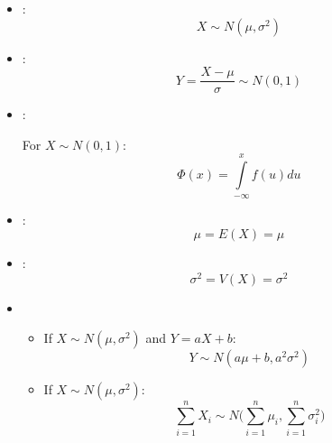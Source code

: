 \begin{multicols*}{3}
    \begin{itemize}
      \item {}:
        \[
          X \sim N(\mu, \sigma^2)
        \]
      \item {}:
        \[
          Y = \frac{X - \mu}{\sigma} \sim N(0, 1)
        \]
      \item {}:
        \par For $X \sim N(0, 1)$:
        \[
          \Phi(x) = \int\limits_{-\infty}^{x} f(u) du
        \]
      \item {}:
        \[
          \mu = E(X) = \mu
        \]
      \item {}:
        \[
          \sigma^2 = V(X) = \sigma^2
        \]
      \item {}
        \begin{itemize}
          \item If $X \sim N(\mu, \sigma^2)$ and $Y = aX + b$:
            \[
              Y \sim N(a\mu + b, a^2 \sigma^2)
            \]
          \item If $X \sim N(\mu, \sigma^2)$:
            \[
              \sum\limits_{i = 1}^{n} X_i \sim N\bigg( \sum\limits_{i = 1}^{n} \mu_i, \sum\limits_{i = 1}^{n} \sigma_i^2 \bigg)
            \]
        \end{itemize}
    \end{itemize}


\end{multicols*}
